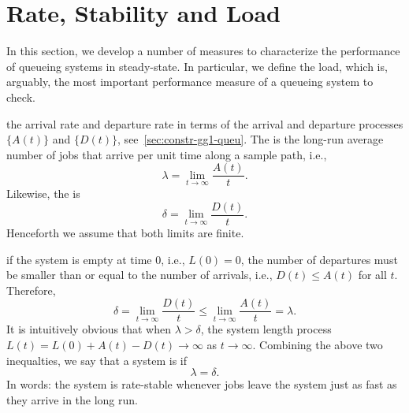 


\section{Rate, Stability and Load}
\label{sec:rate-stability}



In this section, we develop a number of measures to characterize the performance of queueing systems in steady-state.
In particular, we define the load, which is, arguably, the most important performance measure of a queueing system to check.




 the arrival rate and departure rate in terms of the arrival and departure processes $\{A(t)\}$ and $\{D(t)\}$, see~\cref{sec:constr-gg1-queu}.
The  is the long-run average number of jobs that arrive per unit time along a sample path, i.e.,
\begin{equation}\label{eq:3}
 \lambda = \lim_{t\to\infty} \frac{A(t)}t.
\end{equation}
Likewise, the  is
\begin{equation}\label{eq:28}
 \delta = \lim_{t\to\infty} \frac{D(t)}t.
\end{equation}
Henceforth we assume that both limits are finite.

 if the system is empty at time $0$, i.e., $L(0)=0$,
 the number of departures must be smaller than or equal to the number of arrivals, i.e., $D(t) \leq A(t)$ for all $t$.
Therefore,
\begin{equation*}
\delta = \lim_{t\to\infty} \frac{D(t)}t \leq \lim_{t\to\infty} \frac{A(t)}t = \lambda.
\end{equation*}
It is intuitively obvious that when $\lambda > \delta$, the system length process $L(t)=L(0)+A(t) - D(t) \to \infty$ as $t\to \infty$.
Combining the above two inequalties, we say that a system is  if
\begin{equation}\label{eq:84}
 \lambda = \delta.
\end{equation}
In  words: the system is rate-stable whenever jobs leave the system just as fast as they arrive in the long run.


